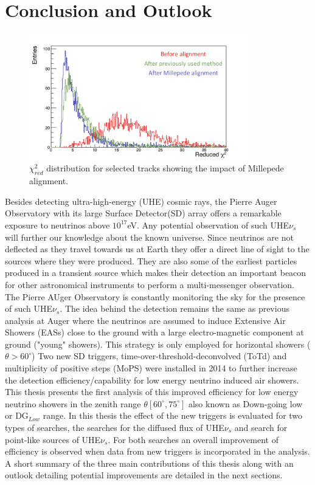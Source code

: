 
\chapter{Conclusion and Outlook}
\label{sec:conc}
\begin{figure}[h!]
\centering
\includegraphics[width=0.85\textwidth]{thesis_figures/chi2_comp_conclusion_2.png}
\caption{$\chi^2_{red}$ distribution for selected tracks showing the impact of Millepede alignment.}
\label{fig:red_chi2_4}
\end{figure}

Besides detecting ultra-high-energy (UHE) cosmic rays, the Pierre Auger Observatory with its large Surface Detector(SD) array offers a remarkable exposure to neutrinos above $10^17$eV. Any potential observation of such UHE$\nu_s$ will further our knowledge about the known universe. Since neutrinos are not deflected as they travel towards us at Earth they offer a direct line of sight to the sources where they were produced. They are also some of the earliest particles produced in a transient source which makes their detection an important beacon for other astronomical instruments to perform a multi-messenger observation. The Pierre AUger Observatory is constantly monitoring the sky for the presence of such UHE$\nu_s$. The idea behind the detection remains the same as previous analysis at Auger where the neutrinos are assumed to induce Extensive Air Showers (EASs) close to the ground with a large electro-magnetic component at ground ("young" showers). This strategy is only employed for horizontal showers ($\theta > 60^{\circ}$) Two new SD triggers, time-over-threshold-deconvolved (ToTd) and multiplicity of positive steps (MoPS) were installed in 2014 to further increase the detection efficiency/capability for low energy neutrino induced air showers. This thesis presents the first analysis of this improved efficiency for low energy neutrino showers in the zenith range $\theta [60^{\circ},75^\circ]$ also known as Down-going low or DG$_{Low}$ range. In this thesis the effect of the new triggers is evaluated for two types of searches, the searches for the diffused flux of UHE$\nu_s$ and search for point-like sources of UHE$\nu_s$. For both searches an overall improvement of efficiency is observed when data from new triggers is incorporated in the analysis. A short summary of the three main contributions of this thesis along with an outlook detailing potential improvements are detailed in the next sections. 
